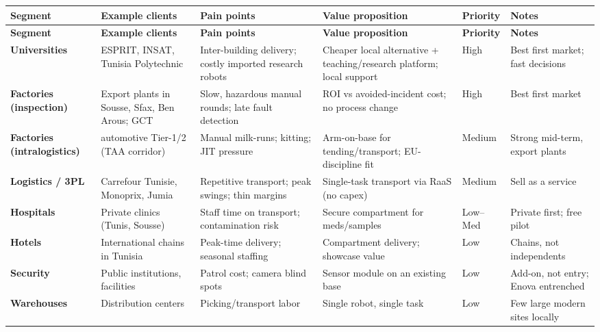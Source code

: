 {\footnotesize
\setlength{\tabcolsep}{4pt}
\renewcommand{\arraystretch}{1.3}
\begin{longtable}{|>{\raggedright\arraybackslash}m{2.4cm}|
                  >{\raggedright\arraybackslash}m{2.3cm}|
                  >{\raggedright\arraybackslash}m{2.9cm}|
                  >{\raggedright\arraybackslash}m{2.9cm}|
                  >{\centering\arraybackslash}m{1.3cm}|
                  >{\raggedright\arraybackslash}m{2cm}|}
\hline
\rowcolor{gray!15}
\textbf{Segment} & \textbf{Example clients} & \textbf{Pain points} & \textbf{Value proposition} & \textbf{Priority} & \textbf{Notes} \\
\hline
\endfirsthead
\hline
\rowcolor{gray!15}
\textbf{Segment} & \textbf{Example clients} & \textbf{Pain points} & \textbf{Value proposition} & \textbf{Priority} & \textbf{Notes} \\
\hline
\endhead
\hline
\endfoot
\textbf{Universities} & ESPRIT, INSAT, Tunisia Polytechnic & Inter-building delivery; costly imported research robots & Cheaper local alternative + teaching/research platform; local support & High & Best first market; fast decisions \\
\hline
\textbf{Factories (inspection)} & Export plants in Sousse, Sfax, Ben Arous; GCT & Slow, hazardous manual rounds; late fault detection & ROI vs avoided-incident cost; no process change & High & Best first market \\
\hline
\textbf{Factories (intralogistics)} & automotive Tier-1/2 (TAA corridor) & Manual milk-runs; kitting; JIT pressure & Arm-on-base for tending/transport; EU-discipline fit & Medium & Strong mid-term, export plants \\
\hline
\textbf{Logistics / 3PL} & Carrefour Tunisie, Monoprix, Jumia & Repetitive transport; peak swings; thin margins & Single-task transport via RaaS (no capex) & Medium & Sell as a service \\
\hline
\textbf{Hospitals} & Private clinics (Tunis, Sousse) & Staff time on transport; contamination risk & Secure compartment for meds/samples & Low--Med & Private first; free pilot \\
\hline
\textbf{Hotels} & International chains in Tunisia & Peak-time delivery; seasonal staffing & Compartment delivery; showcase value & Low & Chains, not independents \\
\hline
\textbf{Security} & Public institutions, facilities & Patrol cost; camera blind spots & Sensor module on an existing base & Low & Add-on, not entry; Enova entrenched \\
\hline
\textbf{Warehouses} & Distribution centers & Picking/transport labor & Single robot, single task & Low & Few large modern sites locally \\
\hline
\end{longtable}
}
